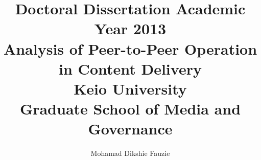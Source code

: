 \title{Doctoral Dissertation Academic Year 2013\\
\vspace{5cm}
Analysis of Peer-to-Peer Operation in Content Delivery \\
\vspace{5cm}
Keio University \\
Graduate School of Media and Governance}
\author{Mohamad Dikshie Fauzie}
\date{}
\maketitle
